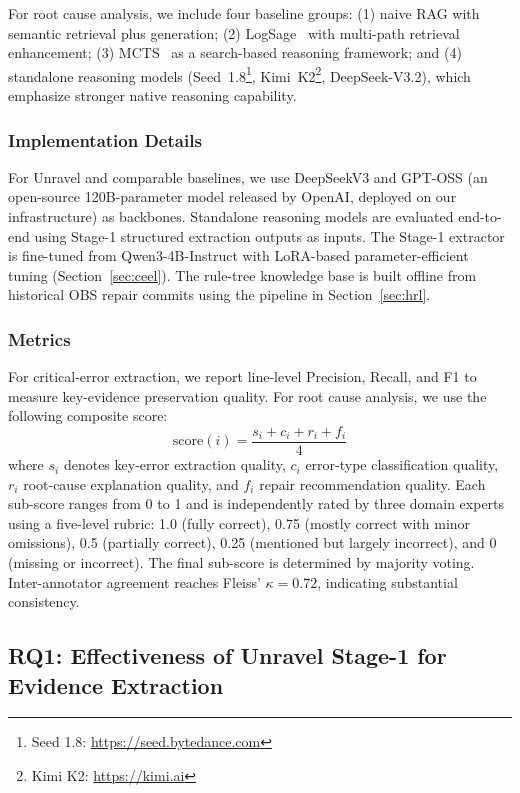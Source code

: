 \documentclass[sigconf,anonymous]{acmart}
\begin{document}
For root cause analysis, we include four baseline groups: (1) naive RAG with semantic retrieval plus generation; (2) LogSage~\cite{xu2025logsage} with multi-path retrieval enhancement; (3) MCTS~\cite{shuai2025root} as a search-based reasoning framework; and (4) standalone reasoning models (Seed~1.8\footnote{Seed 1.8: \url{https://seed.bytedance.com}}, Kimi~K2\footnote{Kimi K2: \url{https://kimi.ai}}, DeepSeek-V3.2), which emphasize stronger native reasoning capability.

\subsubsection{Implementation Details}
For Unravel and comparable baselines, we use DeepSeekV3 and GPT-OSS (an open-source 120B-parameter model released by OpenAI, deployed on our infrastructure) as backbones. Standalone reasoning models are evaluated end-to-end using Stage-1 structured extraction outputs as inputs. The Stage-1 extractor is fine-tuned from Qwen3-4B-Instruct with LoRA-based parameter-efficient tuning (Section~\ref{sec:ceel}). The rule-tree knowledge base is built offline from historical OBS repair commits using the pipeline in Section~\ref{sec:hrl}.

\subsubsection{Metrics}
\begin{sloppypar}
For critical-error extraction, we report line-level Precision, Recall, and F1 to measure key-evidence preservation quality. For root cause analysis, we use the following composite score:
\begin{equation}
\text{score}(i) = \frac{s_i + c_i + r_i + f_i}{4}
\end{equation}
where $s_i$ denotes key-error extraction quality, $c_i$ error-type classification quality, $r_i$ root-cause explanation quality, and $f_i$ repair recommendation quality. Each sub-score ranges from 0 to 1 and is independently rated by three domain experts using a five-level rubric: 1.0 (fully correct), 0.75 (mostly correct with minor omissions), 0.5 (partially correct), 0.25 (mentioned but largely incorrect), and 0 (missing or incorrect). The final sub-score is determined by majority voting. Inter-annotator agreement reaches Fleiss' $\kappa=0.72$, indicating substantial consistency.
\end{sloppypar}

\subsection{RQ1: Effectiveness of Unravel Stage-1 for Evidence Extraction}
\end{document}
